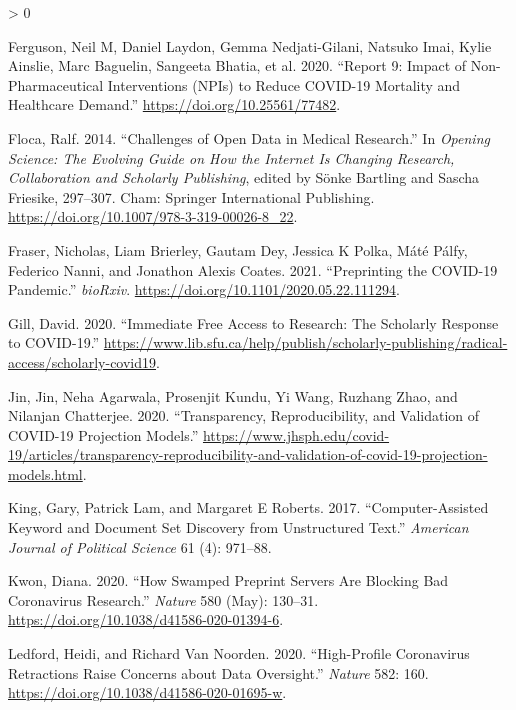 \documentclass[
]{article}
\newlength{\cslhangindent}
\newenvironment{CSLReferences}[2] %
 {%
  \setlength{\parindent}{0pt}
  \ifodd #1 \everypar{\setlength{\hangindent}{\cslhangindent}}\ignorespaces\fi
  \ifnum #2 > 0
  \setlength{\parskip}{#2\baselineskip}
  \fi
 }%
 {}
\begin{document}
\begin{CSLReferences}{1}{0}
\leavevmode\hypertarget{ref-ferguson2020}{}%
Ferguson, Neil M, Daniel Laydon, Gemma Nedjati-Gilani, Natsuko Imai, Kylie Ainslie, Marc Baguelin, Sangeeta Bhatia, et al. 2020. {``Report 9: Impact of Non-Pharmaceutical Interventions (NPIs) to Reduce COVID-19 Mortality and Healthcare Demand.''} \url{https://doi.org/10.25561/77482}.

\leavevmode\hypertarget{ref-Floca2014}{}%
Floca, Ralf. 2014. {``Challenges of Open Data in Medical Research.''} In \emph{Opening Science: The Evolving Guide on How the Internet Is Changing Research, Collaboration and Scholarly Publishing}, edited by Sönke Bartling and Sascha Friesike, 297--307. Cham: Springer International Publishing. \url{https://doi.org/10.1007/978-3-319-00026-8_22}.

\leavevmode\hypertarget{ref-citeFraser}{}%
Fraser, Nicholas, Liam Brierley, Gautam Dey, Jessica K Polka, Máté Pálfy, Federico Nanni, and Jonathon Alexis Coates. 2021. {``Preprinting the COVID-19 Pandemic.''} \emph{bioRxiv}. \url{https://doi.org/10.1101/2020.05.22.111294}.

\leavevmode\hypertarget{ref-gill2020}{}%
Gill, David. 2020. {``Immediate Free Access to Research: The Scholarly Response to COVID-19.''} \url{https://www.lib.sfu.ca/help/publish/scholarly-publishing/radical-access/scholarly-covid19}.

\leavevmode\hypertarget{ref-jin2020}{}%
Jin, Jin, Neha Agarwala, Prosenjit Kundu, Yi Wang, Ruzhang Zhao, and Nilanjan Chatterjee. 2020. {``Transparency, Reproducibility, and Validation of COVID-19 Projection Models.''} \url{https://www.jhsph.edu/covid-19/articles/transparency-reproducibility-and-validation-of-covid-19-projection-models.html}.

\leavevmode\hypertarget{ref-king2017computer}{}%
King, Gary, Patrick Lam, and Margaret E Roberts. 2017. {``Computer-Assisted Keyword and Document Set Discovery from Unstructured Text.''} \emph{American Journal of Political Science} 61 (4): 971--88.

\leavevmode\hypertarget{ref-kwon2020}{}%
Kwon, Diana. 2020. {``How Swamped Preprint Servers Are Blocking Bad Coronavirus Research.''} \emph{Nature} 580 (May): 130--31. \url{https://doi.org/10.1038/d41586-020-01394-6}.

\leavevmode\hypertarget{ref-ledford2020}{}%
Ledford, Heidi, and Richard Van Noorden. 2020. {``High-Profile Coronavirus Retractions Raise Concerns about Data Oversight.''} \emph{Nature} 582: 160. \url{https://doi.org/10.1038/d41586-020-01695-w}.


\end{CSLReferences}
\end{document}
